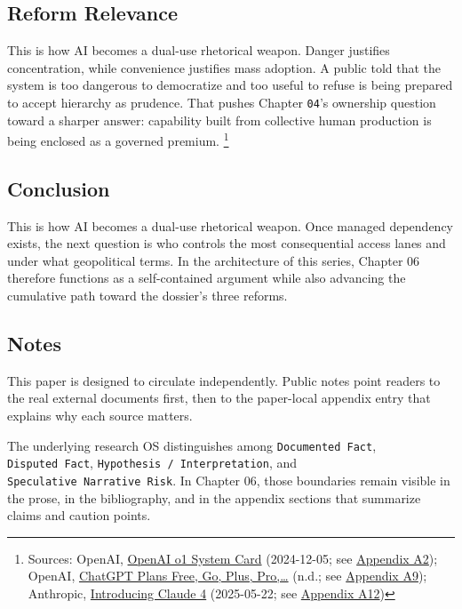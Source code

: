 \documentclass[
  american,
  11pt,
  letterpaper,
]{article}
\begin{document}
\subsection{Reform Relevance}\label{reform-relevance}

This is how AI becomes a dual-use rhetorical weapon. Danger justifies
concentration, while convenience justifies mass adoption. A public told
that the system is too dangerous to democratize and too useful to refuse
is being prepared to accept hierarchy as prudence. That pushes Chapter
\texttt{04}'s ownership question toward a sharper answer: capability
built from collective human production is being enclosed as a governed
premium. \footnote{Sources: OpenAI,
  \href{https://openai.com/index/openai-o1-system-card/}{OpenAI o1
  System Card} (2024-12-05; see
  \hyperref[appendix-a2-openai-o1-system-card]{Appendix A2}); OpenAI,
  \href{https://chatgpt.com/pricing/}{ChatGPT Plans \textbar{} Free, Go,
  Plus, Pro,\ldots{}} (n.d.; see
  \hyperref[appendix-a9-chatgpt-plans-free-go-plus-pro-business-and-enterprise]{Appendix
  A9}); Anthropic,
  \href{https://www.anthropic.com/news/claude-4}{Introducing Claude 4}
  (2025-05-22; see \hyperref[appendix-a12-introducing-claude-4]{Appendix
  A12})}

\subsection{Conclusion}\label{conclusion}

This is how AI becomes a dual-use rhetorical weapon. Once managed
dependency exists, the next question is who controls the most
consequential access lanes and under what geopolitical terms. In the
architecture of this series, Chapter 06 therefore functions as a
self-contained argument while also advancing the cumulative path toward
the dossier's three reforms.

\subsection{Notes}\label{notes}

This paper is designed to circulate independently. Public notes point
readers to the real external documents first, then to the paper-local
appendix entry that explains why each source matters.

The underlying research OS distinguishes among
\texttt{Documented\ Fact}, \texttt{Disputed\ Fact},
\texttt{Hypothesis\ /\ Interpretation}, and
\texttt{Speculative\ Narrative\ Risk}. In Chapter 06, those boundaries
remain visible in the prose, in the bibliography, and in the appendix
sections that summarize claims and caution points.
\end{document}
